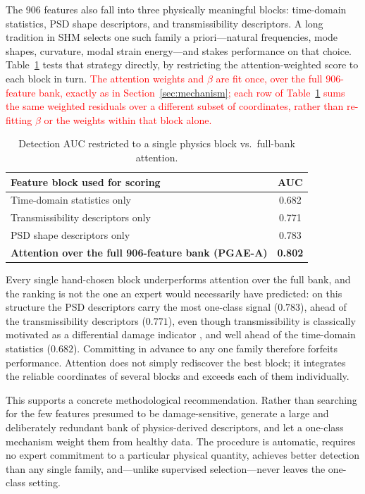 \documentclass[11pt,a4paper]{article}
\begin{document}
The 906 features also fall into three physically meaningful blocks: time-domain
statistics, PSD shape descriptors, and transmissibility descriptors. A long
tradition in SHM selects one such family a priori---natural frequencies, mode
shapes, curvature, modal strain energy---and stakes performance on that choice.
Table~\ref{tab:blocks} tests that strategy directly, by restricting the
attention-weighted score to each block in turn.
\textcolor{red}{The attention weights and $\beta$ are fit once, over the full
$906$-feature bank, exactly as in Section~\ref{sec:mechanism}; each row of
Table~\ref{tab:blocks} sums the same weighted residuals over a different
subset of coordinates, rather than re-fitting $\beta$ or the weights within
that block alone.}

\begin{table}[htbp]
\centering
\caption{Detection AUC restricted to a single physics block vs.\ full-bank attention.}
\label{tab:blocks}
\small
\begin{tabular}{@{}lc@{}}
\toprule
\textbf{Feature block used for scoring} & \textbf{AUC} \\
\midrule
Time-domain statistics only                    & 0.682 \\
Transmissibility descriptors only              & 0.771 \\
PSD shape descriptors only                     & 0.783 \\
\midrule
\textbf{Attention over the full 906-feature bank (PGAE-A)} & \textbf{0.802} \\
\bottomrule
\end{tabular}
\end{table}

Every single hand-chosen block underperforms attention over the full bank, and
the ranking is not the one an expert would necessarily have predicted: on this
structure the PSD descriptors carry the most one-class signal ($0.783$),
ahead of the transmissibility descriptors ($0.771$), even though transmissibility
is classically motivated as a differential damage indicator \cite{johnson2002},
and well ahead of the time-domain statistics ($0.682$). Committing in advance to
any one family therefore forfeits performance. Attention does not simply
rediscover the best block; it integrates the reliable coordinates of several
blocks and exceeds each of them individually.

This supports a concrete methodological recommendation. Rather than searching
for the few features presumed to be damage-sensitive, generate a large and
deliberately redundant bank of physics-derived descriptors, and let a one-class
mechanism weight them from healthy data. The procedure is automatic, requires no
expert commitment to a particular physical quantity, achieves better detection
than any single family, and---unlike supervised selection---never leaves the
one-class setting.
\end{document}
